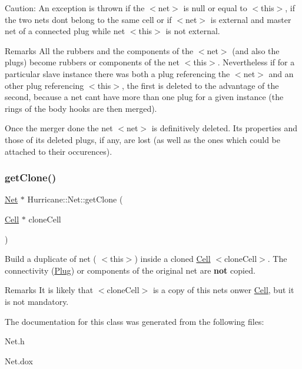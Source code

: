 \begin{DoxyParagraph}{Caution\+: An exception is thrown if the {\ttfamily $<$net$>$} is null or equal to }
{\ttfamily $<$this$>$}, if the two nets don\textquotesingle{}t belong to the same cell or if {\ttfamily $<$net$>$} is external and master net of a connected plug while net {\ttfamily $<$this$>$} is not external.
\end{DoxyParagraph}
\begin{DoxyRemark}{Remarks}
All the rubbers and the components of the {\ttfamily $<$net$>$} (and also the plugs) become rubbers or components of the net {\ttfamily $<$this$>$}. Nevertheless if for a particular slave instance there was both a plug referencing the {\ttfamily $<$net$>$} and an other plug referencing {\ttfamily $<$this$>$}, the first is deleted to the advantage of the second, because a net can\textquotesingle{}t have more than one plug for a given instance (the rings of the body hooks are then merged).

Once the merger done the net {\ttfamily $<$net$>$} is definitively deleted. Its properties and those of its deleted plugs, if any, are lost (as well as the ones which could be attached to their occurences). 
\end{DoxyRemark}
\mbox{\label{classHurricane_1_1Net_a4bd27e6ae22606463491c28437c4068f}} 
\subsubsection{\texorpdfstring{get\+Clone()}{getClone()}}
{\footnotesize\ttfamily \mbox{\hyperlink{classHurricane_1_1Net}{Net}} $\ast$ Hurricane\+::\+Net\+::get\+Clone (\begin{DoxyParamCaption}\item[{\mbox{\hyperlink{classHurricane_1_1Cell}{Cell}} $\ast$}]{clone\+Cell }\end{DoxyParamCaption})}

Build a duplicate of net ({\ttfamily } $<$this$>$) inside a cloned \mbox{\hyperlink{classHurricane_1_1Cell}{Cell}} {\ttfamily } $<$clone\+Cell$>$. The connectivity (\mbox{\hyperlink{classHurricane_1_1Plug}{Plug}}) or components of the original net are {\bfseries not} copied.

\begin{DoxyRemark}{Remarks}
It is likely that {\ttfamily } $<$clone\+Cell$>$ is a copy of this net\textquotesingle{}s onwer \mbox{\hyperlink{classHurricane_1_1Cell}{Cell}}, but it is not mandatory. 
\end{DoxyRemark}


The documentation for this class was generated from the following files\+:\begin{DoxyCompactItemize}
\item 
Net.\+h\item 
Net.\+dox\end{DoxyCompactItemize}
